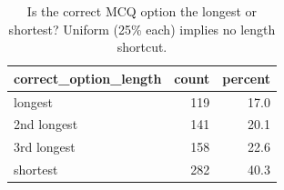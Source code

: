 \begin{table}[t]
\centering
\small
\caption{Is the correct MCQ option the longest or shortest? Uniform (25\% each) implies no length shortcut.}
\label{tab:optlen}
\begin{tabular}{lrr}
\toprule
correct\_option\_length & count & percent \\
\midrule
longest & 119 & 17.0 \\
2nd longest & 141 & 20.1 \\
3rd longest & 158 & 22.6 \\
shortest & 282 & 40.3 \\
\bottomrule
\end{tabular}
\end{table}
